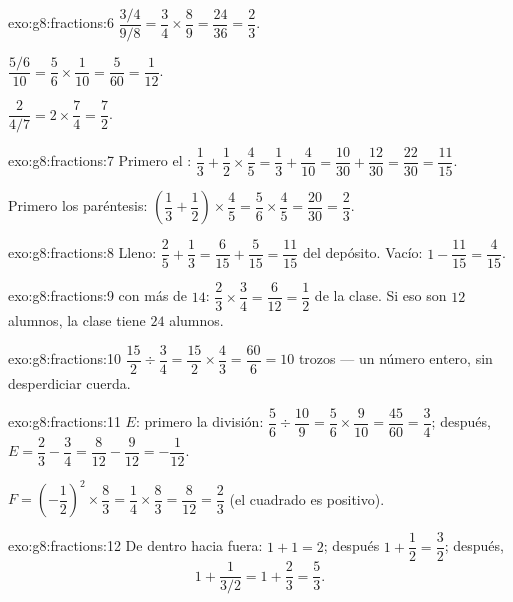 \begin{solution}{exo:g8:fractions:6}
$\dfrac{3/4}{9/8} = \dfrac34 \times \dfrac89 = \dfrac{24}{36} =
\dfrac23$.

$\dfrac{5/6}{10} = \dfrac56 \times \dfrac{1}{10} = \dfrac{5}{60} =
\dfrac{1}{12}$.

$\dfrac{2}{4/7} = 2 \times \dfrac74 = \dfrac72$.
\end{solution}

\begin{solution}{exo:g8:fractions:7}
Primero el :
$\dfrac13 + \dfrac12 \times \dfrac45 = \dfrac13 + \dfrac{4}{10}
= \dfrac{10}{30} + \dfrac{12}{30} = \dfrac{22}{30} = \dfrac{11}{15}$.

Primero los paréntesis:
$\left(\dfrac13 + \dfrac12\right) \times \dfrac45
= \dfrac56 \times \dfrac45 = \dfrac{20}{30} = \dfrac23$.
\end{solution}

\begin{solution}{exo:g8:fractions:8}
Lleno: $\dfrac25 + \dfrac13 = \dfrac{6}{15} + \dfrac{5}{15} =
\dfrac{11}{15}$ del depósito. Vacío:
$1 - \dfrac{11}{15} = \dfrac{4}{15}$.
\end{solution}

\begin{solution}{exo:g8:fractions:9}
 con más de $14$:
$\dfrac23 \times \dfrac34 = \dfrac{6}{12} = \dfrac12$ de la clase.
Si eso son $12$ alumnos, la clase tiene $24$ alumnos.
\end{solution}

\begin{solution}{exo:g8:fractions:10}
$\dfrac{15}{2} \div \dfrac34 = \dfrac{15}{2} \times \dfrac43
= \dfrac{60}{6} = 10$ trozos --- un número entero, sin desperdiciar cuerda.
\end{solution}

\begin{solution}{exo:g8:fractions:11}
$E$: primero la división:
$\dfrac56 \div \dfrac{10}{9} = \dfrac56 \times \dfrac{9}{10}
= \dfrac{45}{60} = \dfrac34$; después,
$E = \dfrac23 - \dfrac34 = \dfrac{8}{12} - \dfrac{9}{12} =
-\dfrac{1}{12}$.

$F = \left(-\dfrac12\right)^2 \times \dfrac83 = \dfrac14 \times
\dfrac83 = \dfrac{8}{12} = \dfrac23$ (el cuadrado es positivo).
\end{solution}

\begin{solution}{exo:g8:fractions:12}
De dentro hacia fuera: $1 + 1 = 2$; después
$1 + \dfrac12 = \dfrac32$; después,
\[
1 + \frac{1}{3/2} = 1 + \frac23 = \frac53 .
\]
\end{solution}

